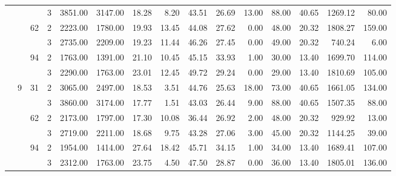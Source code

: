 \begin{tabular}{llllrrrrrrrrrrr}
                &   &    & 3 &  3851.00 &   3147.00 & 18.28 &    8.20 &   43.51 &   26.69 &   13.00 &   88.00 &   40.65 & 1269.12 &    80.00 \\
\cline{3-15}
                &   & \multirow{2}{*}{62} & 2 &  2223.00 &   1780.00 & 19.93 &   13.45 &   44.08 &   27.62 &    0.00 &   48.00 &   20.32 & 1808.27 &   159.00 \\
                &   &    & 3 &  2735.00 &   2209.00 & 19.23 &   11.44 &   46.26 &   27.45 &    0.00 &   49.00 &   20.32 &  740.24 &     6.00 \\
\cline{3-15}
                &   & \multirow{2}{*}{94} & 2 &  1763.00 &   1391.00 & 21.10 &   10.45 &   45.15 &   33.93 &    1.00 &   30.00 &   13.40 & 1699.70 &   114.00 \\
                &   &    & 3 &  2290.00 &   1763.00 & 23.01 &   12.45 &   49.72 &   29.24 &    0.00 &   29.00 &   13.40 & 1810.69 &   105.00 \\
\cline{2-15}
\cline{3-15}
                & \multirow{6}{*}{9} & \multirow{2}{*}{31} & 2 &  3065.00 &   2497.00 & 18.53 &    3.51 &   44.76 &   25.63 &   18.00 &   73.00 &   40.65 & 1661.05 &   134.00 \\
                &   &    & 3 &  3860.00 &   3174.00 & 17.77 &    1.51 &   43.03 &   26.44 &    9.00 &   88.00 &   40.65 & 1507.35 &    88.00 \\
\cline{3-15}
                &   & \multirow{2}{*}{62} & 2 &  2173.00 &   1797.00 & 17.30 &   10.08 &   36.44 &   26.92 &    2.00 &   48.00 &   20.32 &  929.92 &    13.00 \\
                &   &    & 3 &  2719.00 &   2211.00 & 18.68 &    9.75 &   43.28 &   27.06 &    3.00 &   45.00 &   20.32 & 1144.25 &    39.00 \\
\cline{3-15}
                &   & \multirow{2}{*}{94} & 2 &  1954.00 &   1414.00 & 27.64 &   18.42 &   45.71 &   34.15 &    1.00 &   34.00 &   13.40 & 1689.41 &   107.00 \\
                &   &    & 3 &  2312.00 &   1763.00 & 23.75 &    4.50 &   47.50 &   28.87 &    0.00 &   36.00 &   13.40 & 1805.01 &   136.00 \\
\bottomrule
\end{tabular}
